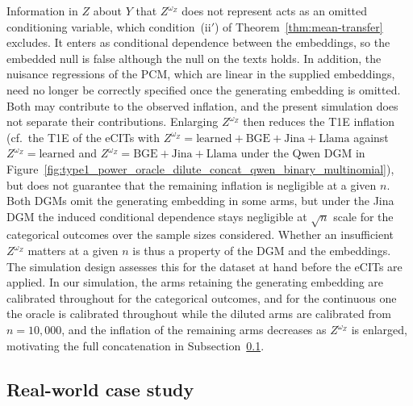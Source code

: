 \documentclass[twoside,11pt]{article}
\begin{document}
Information in $Z$ about $Y$ that $Z^{\omega_Z}$ does not represent acts as an omitted conditioning variable, which condition~(ii$'$) of Theorem~\ref{thm:mean-transfer} excludes. 
It enters as conditional dependence between the embeddings, so the embedded null is false although the null on the texts holds. In addition, the nuisance regressions of the PCM, which are linear in the supplied embeddings, need no longer be correctly specified once the generating embedding is omitted. Both may contribute to the observed inflation, and the present simulation does not separate their contributions.
Enlarging $Z^{\omega_Z}$ then reduces the T1E inflation (cf.\ the T1E of the eCITs with $Z^{\omega_Z}=\text{learned}+\text{BGE}+\text{Jina}+\text{Llama}$ against $Z^{\omega_Z}=\text{learned}$ and $Z^{\omega_Z}=\text{BGE}+\text{Jina}+\text{Llama}$ under the Qwen DGM in Figure~\ref{fig:type1_power_oracle_dilute_concat_qwen_binary_multinomial}), 
but does not guarantee that the remaining inflation is negligible at a given $n$. Both DGMs omit the generating embedding in some arms, but under the Jina DGM the induced conditional dependence stays negligible at $\sqrt{n}$ scale for the categorical outcomes over the sample sizes considered. 
Whether an insufficient $Z^{\omega_Z}$ matters at a given $n$ is thus a property of the DGM and the embeddings. The simulation design assesses this for the dataset at hand before the eCITs are applied. 
In our simulation, the arms retaining the generating embedding are calibrated throughout for the categorical outcomes, and for the continuous one the oracle is calibrated throughout while the diluted arms are calibrated from $n = 10{,}000$, and the inflation of the remaining arms decreases as $Z^{\omega_Z}$ is enlarged,  motivating the full concatenation in Subsection~\ref{subsec:real_world_application}.

\subsection{Real-world case study}\label{subsec:real_world_application}
\end{document}
